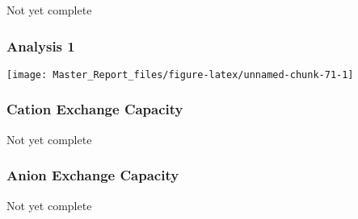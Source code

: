 \documentclass[
]{article}
\begin{document}
Not yet complete

\hypertarget{analysis-1-1}{%
\subsubsection{Analysis 1}\label{analysis-1-1}}

\begin{center}\texttt{[image: Master\_Report\_files/figure-latex/unnamed-chunk-71-1]} \end{center}

\hypertarget{cation-exchange-capacity-1}{%
\subsubsection{Cation Exchange
Capacity}\label{cation-exchange-capacity-1}}

Not yet complete

\hypertarget{anion-exchange-capacity-1}{%
\subsubsection{Anion Exchange
Capacity}\label{anion-exchange-capacity-1}}

Not yet complete
\end{document}
